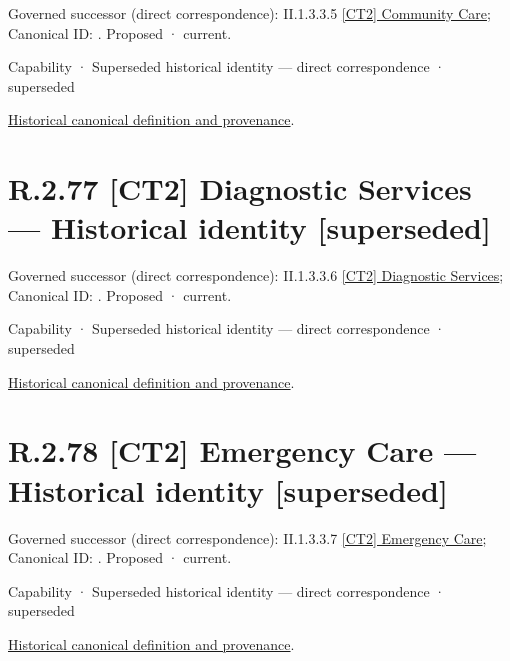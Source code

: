 {\small Governed successor (direct correspondence): II.1.3.3.5 \hyperref[element:942aa78cad004ef99de6b3aae8ddd014]{[CT2] Community Care}; Canonical ID: \texttt{}. Proposed · current.}\par
\label{element:4b7177f3f40449518fba381acae6ba1e}
{\small Capability · Superseded historical identity — direct correspondence · superseded}\par
\href{../../../../../../../continuum/strategy/capability/4b7177f3f40449518fba381acae6ba1e.md}{Historical canonical definition and provenance}.\par
\section*{R.2.77 [CT2] Diagnostic Services — Historical identity [superseded]}
\label{navigation:R.2.77}

{\small Governed successor (direct correspondence): II.1.3.3.6 \hyperref[element:b825ebab42f444d8b738b4c1f489f785]{[CT2] Diagnostic Services}; Canonical ID: \texttt{}. Proposed · current.}\par
\label{element:03a57e0c9ea34f7fb7b78e5f5c85379f}
{\small Capability · Superseded historical identity — direct correspondence · superseded}\par
\href{../../../../../../../continuum/strategy/capability/03a57e0c9ea34f7fb7b78e5f5c85379f.md}{Historical canonical definition and provenance}.\par
\section*{R.2.78 [CT2] Emergency Care — Historical identity [superseded]}
\label{navigation:R.2.78}

{\small Governed successor (direct correspondence): II.1.3.3.7 \hyperref[element:aa088f0647ad4b78966fe28fa80af674]{[CT2] Emergency Care}; Canonical ID: \texttt{}. Proposed · current.}\par
\label{element:e5edbb54258c490aaba0816d980dc624}
{\small Capability · Superseded historical identity — direct correspondence · superseded}\par
\href{../../../../../../../continuum/strategy/capability/e5edbb54258c490aaba0816d980dc624.md}{Historical canonical definition and provenance}.\par

